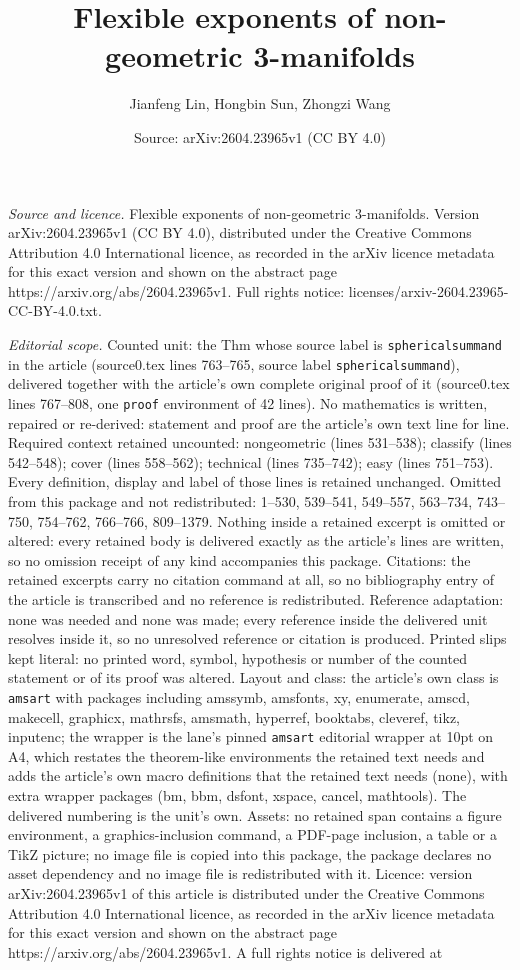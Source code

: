 \documentclass[10pt,a4paper]{amsart}
\title[Flexible exponents of non-geometric 3-manifolds]{Flexible exponents of non-geometric 3-manifolds}
\author{Jianfeng Lin, Hongbin Sun, Zhongzi Wang}
\date{Source: arXiv:2604.23965v1 (CC BY 4.0)}
\begin{document}
\maketitle

\noindent\emph{Source and licence.} Flexible exponents of non-geometric 3-manifolds. Version arXiv:2604.23965v1 (CC BY 4.0), distributed under the Creative Commons Attribution 4.0 International licence, as recorded in the arXiv licence metadata for this exact version and shown on the abstract page https://arxiv.org/abs/2604.23965v1. Full rights notice: licenses/arxiv-2604.23965-CC-BY-4.0.txt.\par\smallskip

\noindent\textit{Editorial scope.} Counted unit: the Thm whose source label is \texttt{sphericalsummand} in the article (source0.tex lines 763--765, source label \texttt{sphericalsummand}), delivered together with the article's own complete original proof of it (source0.tex lines 767--808, one \texttt{proof} environment of 42 lines). No mathematics is written, repaired or re-derived: statement and proof are the article's own text line for line. Required context retained uncounted: nongeometric (lines 531--538); classify (lines 542--548); cover (lines 558--562); technical (lines 735--742); easy (lines 751--753). Every definition, display and label of those lines is retained unchanged. Omitted from this package and not redistributed: 1--530, 539--541, 549--557, 563--734, 743--750, 754--762, 766--766, 809--1379. Nothing inside a retained excerpt is omitted or altered: every retained body is delivered exactly as the article's lines are written, so no omission receipt of any kind accompanies this package. Citations: the retained excerpts carry no citation command at all, so no bibliography entry of the article is transcribed and no reference is redistributed. Reference adaptation: none was needed and none was made; every reference inside the delivered unit resolves inside it, so no unresolved reference or citation is produced. Printed slips kept literal: no printed word, symbol, hypothesis or number of the counted statement or of its proof was altered. Layout and class: the article's own class is \texttt{amsart} with packages including amssymb, amsfonts, xy, enumerate, amscd, makecell, graphicx, mathrsfs, amsmath, hyperref, booktabs, cleveref, tikz, inputenc; the wrapper is the lane's pinned \texttt{amsart} editorial wrapper at 10pt on A4, which restates the theorem-like environments the retained text needs and adds the article's own macro definitions that the retained text needs (none), with extra wrapper packages (bm, bbm, dsfont, xspace, cancel, mathtools). The delivered numbering is the unit's own. Assets: no retained span contains a figure environment, a graphics-inclusion command, a PDF-page inclusion, a table or a TikZ picture; no image file is copied into this package, the package declares no asset dependency and no image file is redistributed with it. Licence: version arXiv:2604.23965v1 of this article is distributed under the Creative Commons Attribution 4.0 International licence, as recorded in the arXiv licence metadata for this exact version and shown on the abstract page https://arxiv.org/abs/2604.23965v1. A full rights notice is delivered at 
\end{document}
